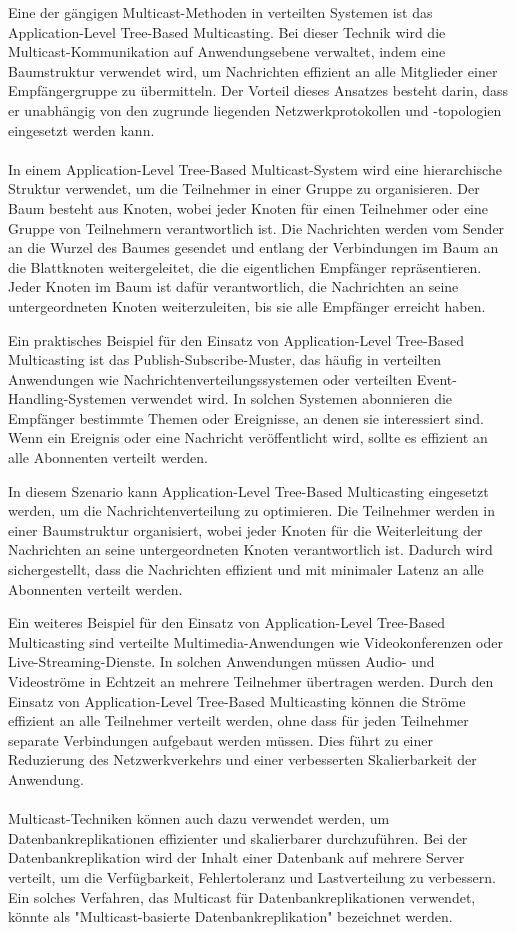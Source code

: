 Eine der gängigen Multicast-Methoden in verteilten Systemen ist das Application-Level Tree-Based Multicasting. Bei dieser Technik wird die Multicast-Kommunikation auf Anwendungsebene verwaltet, indem eine Baumstruktur verwendet wird, um Nachrichten effizient an alle Mitglieder einer Empfängergruppe zu übermitteln. Der Vorteil dieses Ansatzes besteht darin, dass er unabhängig von den zugrunde liegenden Netzwerkprotokollen und -topologien eingesetzt werden kann.
\\\\
In einem Application-Level Tree-Based Multicast-System wird eine hierarchische Struktur verwendet, um die Teilnehmer in einer Gruppe zu organisieren. Der Baum besteht aus Knoten, wobei jeder Knoten für einen Teilnehmer oder eine Gruppe von Teilnehmern verantwortlich ist. Die Nachrichten werden vom Sender an die Wurzel des Baumes gesendet und entlang der Verbindungen im Baum an die Blattknoten weitergeleitet, die die eigentlichen Empfänger repräsentieren. Jeder Knoten im Baum ist dafür verantwortlich, die Nachrichten an seine untergeordneten Knoten weiterzuleiten, bis sie alle Empfänger erreicht haben.

Ein praktisches Beispiel für den Einsatz von Application-Level Tree-Based Multicasting ist das Publish-Subscribe-Muster, das häufig in verteilten Anwendungen wie Nachrichtenverteilungssystemen oder verteilten Event-Handling-Systemen verwendet wird. In solchen Systemen abonnieren die Empfänger bestimmte Themen oder Ereignisse, an denen sie interessiert sind. Wenn ein Ereignis oder eine Nachricht veröffentlicht wird, sollte es effizient an alle Abonnenten verteilt werden.

In diesem Szenario kann Application-Level Tree-Based Multicasting eingesetzt werden, um die Nachrichtenverteilung zu optimieren. Die Teilnehmer werden in einer Baumstruktur organisiert, wobei jeder Knoten für die Weiterleitung der Nachrichten an seine untergeordneten Knoten verantwortlich ist. Dadurch wird sichergestellt, dass die Nachrichten effizient und mit minimaler Latenz an alle Abonnenten verteilt werden.

Ein weiteres Beispiel für den Einsatz von Application-Level Tree-Based Multicasting sind verteilte Multimedia-Anwendungen wie Videokonferenzen oder Live-Streaming-Dienste. In solchen Anwendungen müssen Audio- und Videoströme in Echtzeit an mehrere Teilnehmer übertragen werden. Durch den Einsatz von Application-Level Tree-Based Multicasting können die Ströme effizient an alle Teilnehmer verteilt werden, ohne dass für jeden Teilnehmer separate Verbindungen aufgebaut werden müssen. Dies führt zu einer Reduzierung des Netzwerkverkehrs und einer verbesserten Skalierbarkeit der Anwendung.
\\\\
Multicast-Techniken können auch dazu verwendet werden, um Datenbankreplikationen effizienter und skalierbarer durchzuführen. Bei der Datenbankreplikation wird der Inhalt einer Datenbank auf mehrere Server verteilt, um die Verfügbarkeit, Fehlertoleranz und Lastverteilung zu verbessern. Ein solches Verfahren, das Multicast für Datenbankreplikationen verwendet, könnte als "Multicast-basierte Datenbankreplikation" bezeichnet werden.

